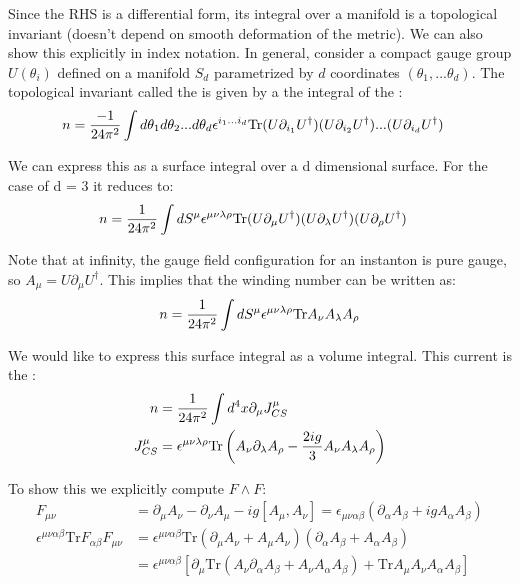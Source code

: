 \documentclass[11pt]{scrartcl}
\begin{document}
Since the RHS is a differential form, its integral over a manifold is a topological invariant (doesn't depend on smooth deformation of the metric).
We can also show this explicitly in index notation.  In general, consider a compact gauge group $U(\theta_i)$ defined on a manifold $S_d$ parametrized by $d$ coordinates $( \theta_1, ... \theta_d)$.  The topological invariant called the  is given by a the integral of the :
\begin{align}
	n & = {- 1 \over 24 \pi^2} \int d \theta_1 d \theta_2 ... d \theta_d \epsilon^{i_1...i_d} \mathrm{Tr} (U \partial_{i_1} U^\dagger) (U \partial_{i_2} U^\dagger) ... (U \partial_{i_d} U^\dagger) 
	\end{align}

We can express this as a surface integral over a d dimensional surface.
For the case of d = 3 it reduces to:
\begin{align}
	n & = {1 \over 24 \pi^2} \int d S^\mu \epsilon^{\mu \nu \lambda \rho} \mathrm{Tr} (U \partial_\mu U^\dagger) (U \partial_\lambda U^\dagger) (U \partial_\rho U^\dagger) 
	\end{align}

Note that at infinity, the gauge field configuration for an instanton is pure gauge, so $A_\mu = U \partial_\mu U^{\dagger}$.  This implies that the winding number can be written as:
\begin{align}
	n & = {1 \over 24 \pi^2} \int d S^\mu \epsilon^{\mu \nu \lambda \rho}  \mathrm{Tr} A_\nu A_\lambda A_\rho  \\
	\end{align} 

We would like to express this surface integral as a volume integral.   This current is the :
\begin{align}
	n &= {1 \over 24 \pi^2} \int d^4 x \partial_\mu J_{CS}^\mu \\
	J_{CS}^\mu & = \epsilon^{\mu \nu \lambda \rho} \mathrm{Tr} \left(A_\nu \partial_\lambda A_\rho - {2 ig  \over 3} A_\nu A_\lambda A_\rho \right) 
	\end{align} 

To show this we explicitly compute $F \wedge F$:
\begin{align}
		F_{\mu \nu} &= \partial_\mu A_\nu - \partial_\nu A_\mu - {i g} [A_\mu, A_\nu]  = \epsilon_{\mu \nu \alpha \beta} \left(\partial_\alpha A_\beta + ig A_\alpha A_\beta \right) \\
	\epsilon^{\mu \nu \alpha \beta} \mathrm{Tr} F_{\alpha \beta} F_{\mu \nu} & = \epsilon^{\mu \nu \alpha \beta} \mathrm{Tr} \left(\partial_\mu A_\nu  + A_\mu A_\nu \right)  \left(\partial_\alpha A_\beta  + A_\alpha A_\beta \right) \\
   &= \epsilon^{\mu \nu \alpha \beta} \left[ \partial_\mu \mathrm{Tr} \left( A_\nu \partial_\alpha A_\beta + A_\nu A_\alpha A_\beta  \right)  + \mathrm{Tr} A_\mu A_\nu A_\alpha A_\beta \right]
	\end{align}
\end{document}
